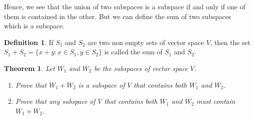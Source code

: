 \documentclass[12pt, a4paper]{article}
\newtheorem{theorem}{Theorem}[section]
\theoremstyle{definition}
\newtheorem{definition}{Definition}[section]
\theoremstyle{remark}
\theoremstyle{solution}
\begin{document}
Hence, we see that the union of two subspaces is a subspace if and only if one of them is contained in the other. But we can define the sum of two subspaces which is a subspace.

\begin{definition}
    If $S_1$ and $S_2$ are two non empty sets of vector space $V$, then the set $S_1 + S_2 = \{x+y : x \in S_1, y \in S_2\}$ is called the sum of $S_1$ and $S_2$. 
\end{definition}

\begin{theorem}
    Let $W_1$ and $W_2$ be the subspaces of vector space $V$.
    \begin{enumerate}
        \item[(a)] Prove that $W_1+W_2$ is a subspace of $V$ that contains both $W_1$ and $W_2$.
        \item[(b)] Prove that any subspace of $V$ that contains both $W_1$ and $W_2$ must contain $W_1+W_2$.
    \end{enumerate}
\end{theorem}
\end{document}
